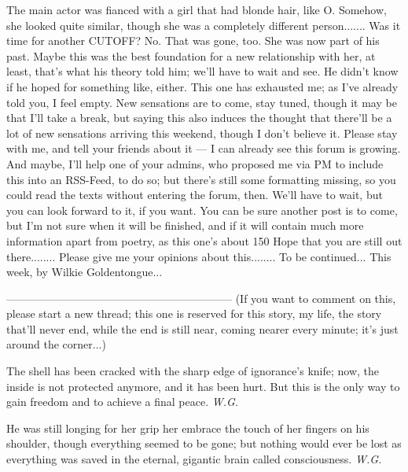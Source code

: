 The main actor was fianced with a girl that had blonde hair, like O. Somehow, she looked quite similar, though she was a completely different person.......
Was it time for another CUTOFF?
No. That was gone, too. She was now part of his past. Maybe this was the best foundation for a new relationship with her, at least, that's what his theory told him; we'll have to wait and see. 
He didn't know if he hoped for something like, either. 
This one has exhausted me; as I've already told you, I feel empty. New sensations are to come, stay tuned, though it may be that I'll take a break, but saying this also induces the thought that there'll be a lot of new sensations arriving this weekend, though I don't believe it. 
Please stay with me, and tell your friends about it --- I can already see this forum is growing. 
And maybe, I'll help one of your admins, who proposed me via PM to include this into an RSS-Feed, to do so; but there's still some formatting missing, so you could read the texts without entering the forum, then. 
We'll have to wait, but you can look forward to it, if you want. 
You can be sure another post is to come, but I'm not sure when it will be finished, and if it will contain much more information apart from poetry, as this one's about 150 %
Hope that you are still out there........
Please give me your opinions about this........
To be continued...
This week, by Wilkie Goldentongue...

--------------------------------------------------------------
(If you want to comment on this, please start a new thread; this one is reserved for this story, my life, the story that'll never end, while the end is still near, coming nearer every minute; it's just around the corner...)

The shell has been cracked
with the sharp edge
of ignorance's knife;
now, the inside is not protected anymore,
and it has been hurt. 
But this is the only way to gain freedom
and to achieve a final peace. 
\emph{W.G.}

He was still longing for her grip
her embrace
the touch of her fingers on his shoulder,
though everything seemed to be gone; 
but nothing would ever be lost
as everything was saved
in the eternal, gigantic brain
called consciousness. 
\emph{W.G.}
